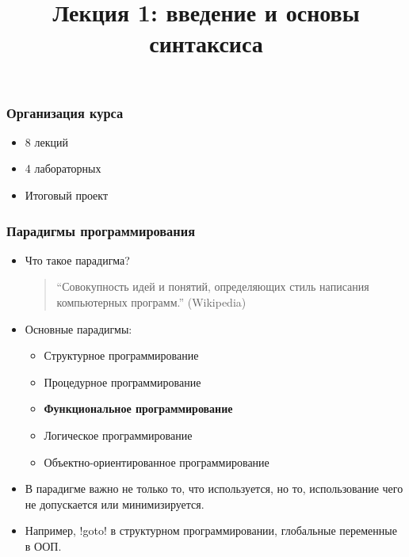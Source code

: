 \documentclass[10pt]{beamer}
\title{Лекция 1: введение и основы синтаксиса}
\begin{document}
\begin{frame}[plain]
  \maketitle
\end{frame}

\begin{frame}
  \frametitle{Организация курса}
  \begin{itemize}
    \item 8 лекций
    \item 4 лабораторных
    \item Итоговый проект
  \end{itemize}
\end{frame}

\begin{frame}
  \frametitle{Парадигмы программирования}
  \begin{itemize}
    \item Что такое парадигма?
          \pause
          \begin{quote}
            \enquote{Совокупность идей и понятий, определяющих стиль написания компьютерных программ.} (Wikipedia)
          \end{quote}
          \pause
    \item Основные парадигмы:
          \pause
          \begin{itemize}
            \item Структурное программирование
            \item Процедурное программирование
            \item \textbf{Функциональное программирование}
            \item Логическое программирование
            \item Объектно-ориентированное программирование
          \end{itemize}
          \pause
    \item В парадигме важно не только то, что используется, но то, использование чего не допускается или минимизируется.
          \pause
    \item Например, \haskinline!goto! в структурном программировании, глобальные переменные в ООП.
  \end{itemize}
\end{frame}
\end{document}

